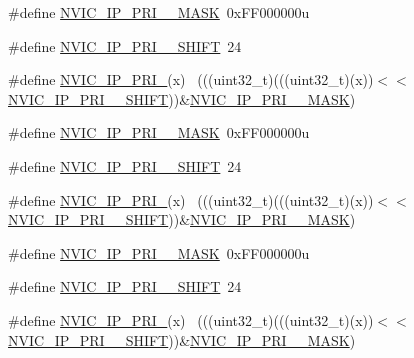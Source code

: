 \begin{DoxyCompactItemize}
\item 
\#define \hyperlink{group___n_v_i_c___register___masks_ga7d7c0405750d75219f0fe0e3c5f48a26}{N\+V\+I\+C\+\_\+\+I\+P\+\_\+\+P\+R\+I\+\_\+\_\+\+M\+A\+SK}~0x\+F\+F000000u
\item 
\#define \hyperlink{group___n_v_i_c___register___masks_ga776c73ffc75170acf87f8bb3cf86ba6a}{N\+V\+I\+C\+\_\+\+I\+P\+\_\+\+P\+R\+I\+\_\+\_\+\+S\+H\+I\+FT}~24
\item 
\#define \hyperlink{group___n_v_i_c___register___masks_gafac7e1a5c7d7bbd66985404cefe158ff}{N\+V\+I\+C\+\_\+\+I\+P\+\_\+\+P\+R\+I\+\_}(x)                                            ~(((uint32\+\_\+t)(((uint32\+\_\+t)(x))$<$$<$\hyperlink{group___n_v_i_c___register___masks_ga776c73ffc75170acf87f8bb3cf86ba6a}{N\+V\+I\+C\+\_\+\+I\+P\+\_\+\+P\+R\+I\+\_\+\_\+\+S\+H\+I\+FT}))\&\hyperlink{group___n_v_i_c___register___masks_ga7d7c0405750d75219f0fe0e3c5f48a26}{N\+V\+I\+C\+\_\+\+I\+P\+\_\+\+P\+R\+I\+\_\+\_\+\+M\+A\+SK})
\item 
\#define \hyperlink{group___n_v_i_c___register___masks_gad864335f4d314be1c523a3c03ccfb7fb}{N\+V\+I\+C\+\_\+\+I\+P\+\_\+\+P\+R\+I\+\_\+\_\+\+M\+A\+SK}~0x\+F\+F000000u
\item 
\#define \hyperlink{group___n_v_i_c___register___masks_ga184d91d952f768db5f9df425bc4e2d5a}{N\+V\+I\+C\+\_\+\+I\+P\+\_\+\+P\+R\+I\+\_\+\_\+\+S\+H\+I\+FT}~24
\item 
\#define \hyperlink{group___n_v_i_c___register___masks_ga92202e88cfcb39250346ea7f3f297f44}{N\+V\+I\+C\+\_\+\+I\+P\+\_\+\+P\+R\+I\+\_}(x)                                            ~(((uint32\+\_\+t)(((uint32\+\_\+t)(x))$<$$<$\hyperlink{group___n_v_i_c___register___masks_ga184d91d952f768db5f9df425bc4e2d5a}{N\+V\+I\+C\+\_\+\+I\+P\+\_\+\+P\+R\+I\+\_\+\_\+\+S\+H\+I\+FT}))\&\hyperlink{group___n_v_i_c___register___masks_gad864335f4d314be1c523a3c03ccfb7fb}{N\+V\+I\+C\+\_\+\+I\+P\+\_\+\+P\+R\+I\+\_\+\_\+\+M\+A\+SK})
\item 
\#define \hyperlink{group___n_v_i_c___register___masks_ga6bc8292c72e770b70906d30e2c712e38}{N\+V\+I\+C\+\_\+\+I\+P\+\_\+\+P\+R\+I\+\_\+\_\+\+M\+A\+SK}~0x\+F\+F000000u
\item 
\#define \hyperlink{group___n_v_i_c___register___masks_ga55c83c35b77e5394b26be4a54a25df8b}{N\+V\+I\+C\+\_\+\+I\+P\+\_\+\+P\+R\+I\+\_\+\_\+\+S\+H\+I\+FT}~24
\item 
\#define \hyperlink{group___n_v_i_c___register___masks_ga6b64b6867cf2c44230d22848c38f941d}{N\+V\+I\+C\+\_\+\+I\+P\+\_\+\+P\+R\+I\+\_}(x)                                            ~(((uint32\+\_\+t)(((uint32\+\_\+t)(x))$<$$<$\hyperlink{group___n_v_i_c___register___masks_ga55c83c35b77e5394b26be4a54a25df8b}{N\+V\+I\+C\+\_\+\+I\+P\+\_\+\+P\+R\+I\+\_\+\_\+\+S\+H\+I\+FT}))\&\hyperlink{group___n_v_i_c___register___masks_ga6bc8292c72e770b70906d30e2c712e38}{N\+V\+I\+C\+\_\+\+I\+P\+\_\+\+P\+R\+I\+\_\+\_\+\+M\+A\+SK})
$$
\end{DoxyCompactItemize}
